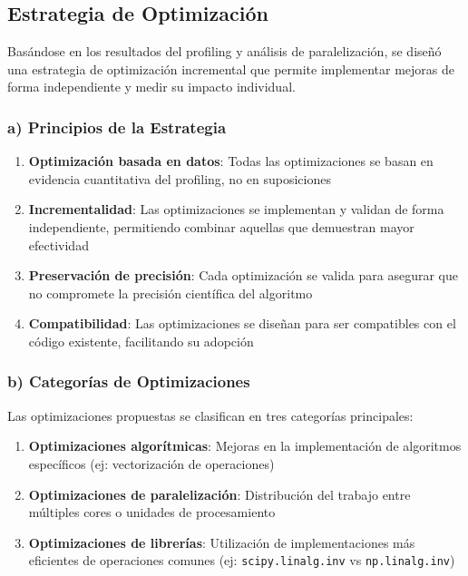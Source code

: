 \subsection{Estrategia de Optimización}

Basándose en los resultados del profiling y análisis de paralelización, se diseñó una estrategia de optimización incremental que permite implementar mejoras de forma independiente y medir su impacto individual.

\subsubsection{a) Principios de la Estrategia}

\begin{enumerate}
    \item \textbf{Optimización basada en datos}: Todas las optimizaciones se basan en evidencia cuantitativa del profiling, no en suposiciones
    \item \textbf{Incrementalidad}: Las optimizaciones se implementan y validan de forma independiente, permitiendo combinar aquellas que demuestran mayor efectividad
    \item \textbf{Preservación de precisión}: Cada optimización se valida para asegurar que no compromete la precisión científica del algoritmo
    \item \textbf{Compatibilidad}: Las optimizaciones se diseñan para ser compatibles con el código existente, facilitando su adopción
\end{enumerate}

\subsubsection{b) Categorías de Optimizaciones}

Las optimizaciones propuestas se clasifican en tres categorías principales:

\begin{enumerate}
    \item \textbf{Optimizaciones algorítmicas}: Mejoras en la implementación de algoritmos específicos (ej: vectorización de operaciones)
    \item \textbf{Optimizaciones de paralelización}: Distribución del trabajo entre múltiples cores o unidades de procesamiento
    \item \textbf{Optimizaciones de librerías}: Utilización de implementaciones más eficientes de operaciones comunes (ej: \texttt{scipy.linalg.inv} vs \texttt{np.linalg.inv})
\end{enumerate}

